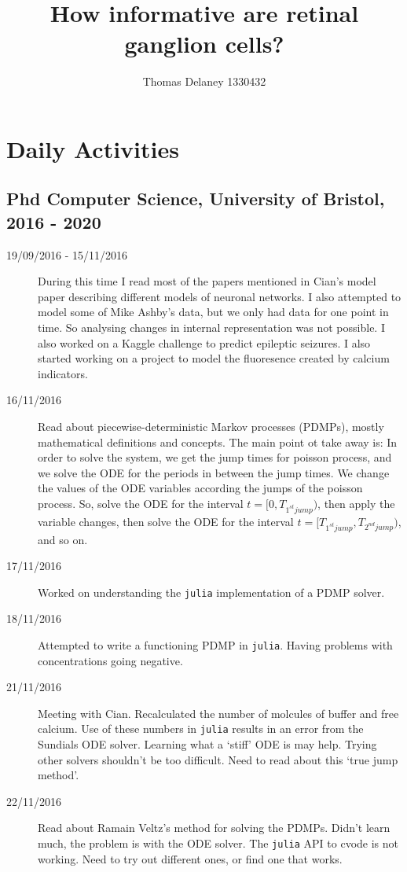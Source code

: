 \documentclass[a4paper,12pt]{article}
\title{How informative are retinal ganglion cells?}
\author{Thomas Delaney 1330432}
\theoremstyle{definition}
\begin{document}
\section*{Daily Activities}
\subsection*{Phd Computer Science, University of Bristol, 2016 - 2020}

\begin{description}
	\item[19/09/2016 - 15/11/2016] During this time I read most of the papers mentioned in Cian's model paper describing different models of neuronal networks. I also attempted to model some of Mike Ashby's data, but we only had data for one point in time. So analysing changes in internal representation was not possible. I also worked on a Kaggle challenge to predict epileptic seizures. I also started working on a project to model the fluoresence created by calcium indicators.

	\item[16/11/2016] Read about piecewise-deterministic Markov processes (PDMPs), mostly \\ mathematical definitions and concepts. The main point ot take away is: In order to solve the system, we get the jump times for poisson process, and we solve the ODE for the periods in between the jump times. We change the values of the ODE variables according the jumps of the poisson process. So, solve the ODE for the interval $t = [0, T_{1^{st} jump})$, then apply the variable changes, then solve the ODE for the interval $t = [T_{1^{st} jump}, T_{2^{nd} jump})$, and so on.

	\item[17/11/2016] Worked on understanding the \texttt{julia} implementation of a PDMP solver.

	\item[18/11/2016] Attempted to write a functioning PDMP in \texttt{julia}. Having problems with concentrations going negative.

	\item[21/11/2016] Meeting with Cian. Recalculated the number of molcules of buffer and free calcium. Use of these numbers in \texttt{julia} results in an error from the Sundials ODE solver. Learning what a `stiff' ODE is may help. Trying other solvers shouldn't be too difficult. Need to read about this `true jump method'.

	\item[22/11/2016] Read about Ramain Veltz's method for solving the PDMPs. Didn't learn much, the problem is with the ODE solver. The \texttt{julia} API to cvode is not working. Need to try out different ones, or find one that works.


\end{description}
\end{document}
